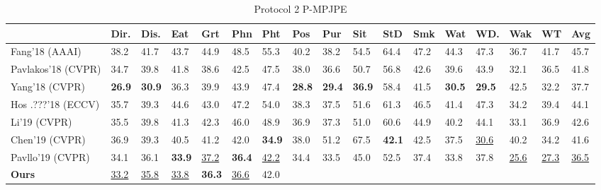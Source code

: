 \documentclass[runningheads]{llncs}
\begin{document}
\begin{table}
\caption{Protocol 2 P-MPJPE}
\begin{center}


\tiny
\begin{tabular}{|l|l|l|l|l|l|l|l|l|l|l|l|l|l|l|l|l| }\hline

 & Dir.& Dis.& Eat & Grt & Phn & Pht& Pos& Pur & Sit& StD & Smk & Wat & WD. & Wak & WT & Avg \\ \hline

Fang'18 (AAAI)& 38.2 & 41.7 & 43.7 & 44.9 & 48.5 & 55.3 & 40.2 & 38.2 & 54.5 & 64.4 & 47.2 & 44.3 & 47.3 & 36.7 & 41.7 & 45.7 \\ \hline

Pavlakos'18 (CVPR) & 34.7 & 39.8 & 41.8 & 38.6 & 42.5 & 47.5 & 38.0 & 36.6 & 50.7 & 56.8 & 42.6 & 39.6 & 43.9 & 32.1 & 36.5 & 41.8 \\ \hline

Yang'18 (CVPR) & \textbf{26.9} & \textbf{30.9} & 36.3 & 39.9 & 43.9 & 47.4 & \textbf{28.8} & \textbf{29.4} & \textbf{36.9} & 58.4 & 41.5 & \textbf{30.5} & \textbf{29.5} & 42.5 & 32.2 & 37.7 \\ \hline

Hos .???'18 (ECCV)& 35.7 & 39.3 & 44.6 & 43.0 & 47.2 & 54.0 & 38.3 & 37.5 & 51.6 & 61.3 & 46.5 & 41.4 & 47.3 & 34.2 & 39.4 & 44.1 \\ \hline

Li'19 (CVPR)  & 35.5 & 39.8 & 41.3 & 42.3 & 46.0 & 48.9 & 36.9 & 37.3 & 51.0 & 60.6 & 44.9 & 40.2 &  44.1 & 33.1 & 36.9 & 42.6  \\ \hline
Chen'19 (CVPR)& 36.9 & 39.3 & 40.5 & 41.2 & 42.0 & \textbf{34.9} & 38.0 & 51.2 & 67.5 & \textbf{42.1} & 42.5 & 37.5 & \underline{30.6} & 40.2 & 34.2 & 41.6 \\ \hline

Pavllo'19 (CVPR) & 34.1 & 36.1 & \textbf{33.9} & \underline{37.2} & \textbf{36.4} & \underline{42.2} & 34.4 & 33.5 & 45.0 & 52.5 & 37.4 & 33.8 & 37.8 & \underline{25.6} & \underline{27.3} & \underline{36.5}\\ \hline



\textbf{Ours} &

\underline{33.2} &

\underline{35.8} &

\underline{33.8} &

\textbf{36.3} &

\underline{36.6} &

42.0 &


\end{tabular}
\end{center}
\end{table}
\end{document}

